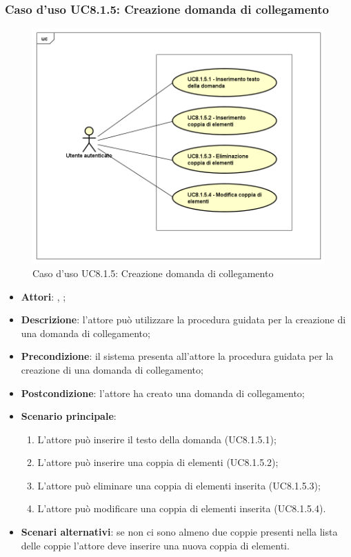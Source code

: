 \subsubsection{Caso d'uso UC8.1.5: Creazione domanda di collegamento}
\label{UC8.1.5}
\begin{figure}[ht]
	\centering
\includegraphics[scale=0.5,keepaspectratio]{UML/UC8_1_5.png}
	\caption{Caso d'uso UC8.1.5: Creazione domanda di collegamento}
\end{figure}
\FloatBarrier
\begin{itemize}
	\item \textbf{Attori}: \uau, \uaupro;
	\item \textbf{Descrizione}: l'attore può utilizzare la procedura guidata per la creazione di una domanda di collegamento; 
	\item \textbf{Precondizione}: il sistema presenta all'attore la procedura guidata per la creazione di una domanda di collegamento;
	\item \textbf{Postcondizione}: l'attore ha creato una domanda di collegamento;
	\item \textbf{Scenario principale}: 
		\begin{enumerate}
			\item L'attore può inserire il testo della domanda (UC8.1.5.1);
			\item L'attore può inserire una coppia di elementi (UC8.1.5.2);
			\item L'attore può eliminare una coppia di elementi inserita (UC8.1.5.3);
			\item L'attore può modificare una coppia di elementi inserita (UC8.1.5.4).
		\end{enumerate}
	\item \textbf{Scenari alternativi}: se non ci sono almeno due coppie presenti nella lista delle coppie l'attore deve inserire una nuova coppia di elementi.
\end{itemize}

